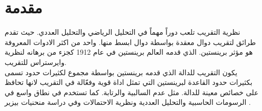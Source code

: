 \chapter*{مقدمة}

نظرية التقريب تلعب دوراً مهماً في التحليل الرياضي والتحليل العددي. حيث تقدم طرائق لتقريب دوال معقدة بواسطة دوال ابسط منها. واحد من اكثر الادوات المعروفة هو مؤثر برينستين. الذي قدمه العالم برينستين في عام 1912 كجزء من برهانه لنظرية وايرستراس للتقريب.\\
\noindent
يكون التقريب للدالة الذي قدمه برينستين بواسطة مجموع لكثيرات حدود تسمى بكثيرات حدود القاعدة لبرينستين التي تمثل اداة قوية وفعّالة في التقريب لانها تحافظ على خصائص معينة للدالة. مثل عدم السالبية والرتابة. كما تستخدم في نطاق واسع في الرسومات الحاسبية والتحليل العددية ونظرية الاحتمالات وفي دراسة منحنيات بيزير .